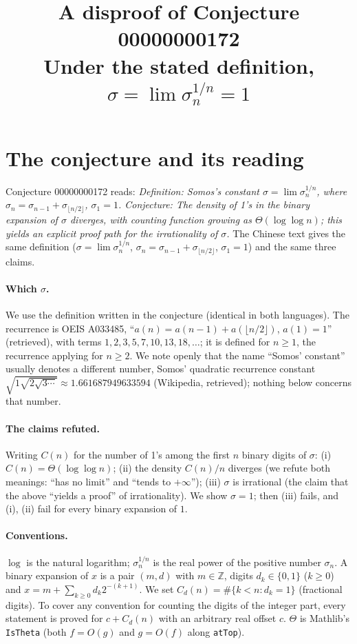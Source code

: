 \documentclass[11pt]{article}
\title{A disproof of Conjecture 00000000172\\[2pt]
\large Under the stated definition, $\sigma = \lim \sigma_n^{1/n} = 1$}
\date{}
\theoremstyle{definition}
\theoremstyle{remark}
\renewcommand{\_}{\oldus\allowbreak}
\begin{document}
\sloppy
\maketitle

\section{The conjecture and its reading}

Conjecture 00000000172 reads: \emph{Definition: Somos's constant $\sigma = \lim \sigma_n^{1/n}$, where
$\sigma_n = \sigma_{n-1} + \sigma_{\lfloor n/2\rfloor}$, $\sigma_1 = 1$. Conjecture: The density of 1's in the
binary expansion of $\sigma$ diverges, with counting function growing as $\Theta(\log\log n)$; this
yields an explicit proof path for the irrationality of $\sigma$.} The Chinese text gives the same
definition ($\sigma=\lim \sigma_n^{1/n}$, $\sigma_n=\sigma_{n-1}+\sigma_{\lfloor n/2\rfloor}$, $\sigma_1=1$) and the
same three claims.

\paragraph{Which $\sigma$.} We use the definition written in the conjecture (identical in both
languages). The recurrence is OEIS A033485, ``$a(n) = a(n-1) + a(\lfloor n/2\rfloor)$, $a(1) = 1$''
(retrieved), with terms $1,2,3,5,7,10,13,18,\dots$; it is defined for $n\ge1$, the recurrence applying
for $n \ge 2$. We note openly that the name ``Somos' constant'' usually denotes a different number,
Somos' quadratic recurrence constant $\sqrt{1\sqrt{2\sqrt{3\cdots}}} \approx 1.661687949633594$
(Wikipedia, retrieved); nothing below concerns that number.

\paragraph{The claims refuted.} Writing $C(n)$ for the number of 1's among the first $n$ binary digits of
$\sigma$:
(i) $C(n) = \Theta(\log\log n)$;
(ii) the density $C(n)/n$ diverges (we refute both meanings: ``has no limit'' and ``tends to $+\infty$'');
(iii) $\sigma$ is irrational (the claim that the above ``yields a proof'' of irrationality).
We show $\sigma = 1$; then (iii) fails, and (i), (ii) fail for every binary expansion of $1$.

\paragraph{Conventions.} $\log$ is the natural logarithm; $\sigma_n^{1/n}$ is the real power of the
positive number $\sigma_n$. A binary expansion of $x$ is a pair $(m,d)$ with $m\in\mathbb Z$, digits
$d_k \in\{0,1\}$ ($k\ge0$) and $x = m + \sum_{k\ge0} d_k 2^{-(k+1)}$. We set
$C_d(n) = \#\{k<n : d_k = 1\}$ (fractional digits). To cover any convention for counting the digits of
the integer part, every statement is proved for $c + C_d(n)$ with an arbitrary real offset $c$.
$\Theta$ is Mathlib's \texttt{IsTheta} (both $f = O(g)$ and $g = O(f)$ along \texttt{atTop}).
\end{document}
